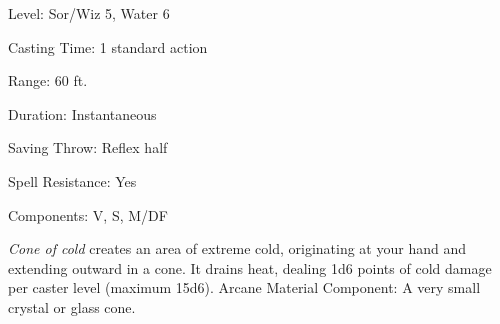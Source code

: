 
\begin{description*}
\item[Level:] Sor/Wiz 5, Water 6
\item[Casting Time:] 1 standard action
\item[Range:] 60 ft.
\item[Duration:] Instantaneous
\item[Saving Throw:] Reflex half
\item[Spell Resistance:] Yes
\item[Components:] V, S, M/DF
\end{description*}

\textit{Cone of cold} creates an area of extreme cold, originating at your hand
and extending outward in a cone. It drains heat, dealing 1d6 points of cold damage
per caster level (maximum 15d6).
Arcane Material Component: A very small crystal or glass cone.